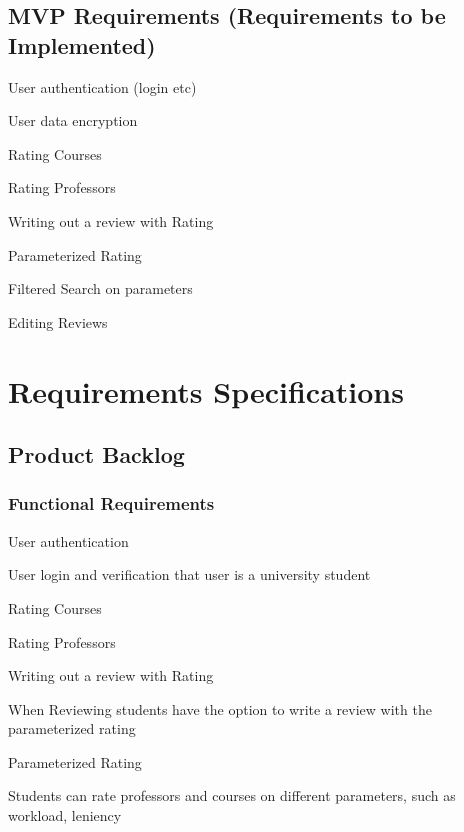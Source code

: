 \documentclass{article}
\begin{document}
\break

\subsection{MVP Requirements (Requirements to be Implemented)}

	\quad User authentication (login etc)

	\quad User data encryption

	\quad Rating Courses

	\quad Rating Professors

	\quad Writing out a review with Rating

	\quad Parameterized Rating

	\quad Filtered Search on parameters	

	\quad Editing Reviews



\section{Requirements Specifications}

\subsection{Product Backlog}

\subsubsection{Functional Requirements}

	\quad User authentication 
	\vspace{-0.2cm}

	\qquad \scriptsize User login and verification that user is a university student \normalsize

	\quad Rating Courses

	\quad Rating Professors

	\quad Writing out a review with Rating
	\vspace{-0.2cm}

	\qquad \scriptsize When Reviewing students have the option to write a review with the parameterized rating \normalsize

	\quad Parameterized Rating
	\vspace{-0.2cm}

	\qquad \scriptsize Students can rate professors and courses on different parameters, such as workload, leniency \normalsize
\end{document}
